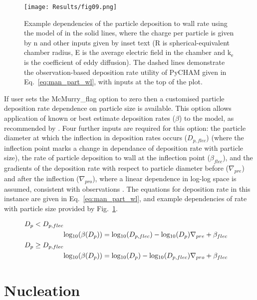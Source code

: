 \documentclass[gmd, manuscript]{copernicus}
\begin{document}
\begin{figure}[t]
\texttt{[image: Results/fig09.png]}
\caption{Example dependencies of the particle deposition to wall rate using the model of \citet{McMurry1985} in the solid lines, where the charge per particle is given by n and other inputs given by inset text (R is spherical-equivalent chamber radius, E is the average electric field in the chamber and $\mathrm{k_e}$ is the coefficient of eddy diffusion).  The dashed lines demonstrate the observation-based deposition rate utility of PyCHAM given in Eq.~\ref{eq:man_part_wl}, with inputs at the top of the plot.}
\label{fig:part_wall_depo_plot}
\end{figure}

If user sets the McMurry\_flag option to zero then a customised particle deposition rate dependence on particle size is available.  This option allows application of known or best estimate deposition rates ($\beta$) to the model, as recommended by \citet{Wang2018}.  Four further inputs are required for this option: the particle diameter at which the inflection in deposition rates occurs ($D_{p,flec}$) (where the inflection point marks a change in dependance of deposition rate with particle size), the rate of particle deposition to wall at the inflection point ($\beta_{flec}$), and the gradients of the deposition rate with respect to particle diameter before ($\nabla_{pre}$) and after the inflection ($\nabla_{pro}$), where a linear dependence in log-log space is assumed, consistent with observations \citep{Charan2019}.  The equations for deposition rate in this instance are given in Eq.~\ref{eq:man_part_wl}, and example dependencies of rate with particle size provided by Fig.~\ref{fig:part_wall_depo_plot}.

\begin{align} \label{eq:man_part_wl}
D_{p}<D_{p,flec} \nonumber \\
&\rm{log_{10}}(\mit{\beta(D_{p}})) = \rm{log_{10}}(\mit{D_{p,flec}})-\rm{log_{10}}\mit{(D_{p})}\nabla_{pre}+\beta_{flec} \nonumber \\
D_{p}\geq D_{p,flec} \nonumber \\
&\rm{log_{10}}(\mit{\beta(D_{p}})) = \rm{log_{10}}(\mit{D_{p}})-\rm{log_{10}}\mit{(D_{p,flec})}\nabla_{pro}+\beta_{flec}
\end{align}



\section{Nucleation}\label{sec:nuc}
\end{document}
